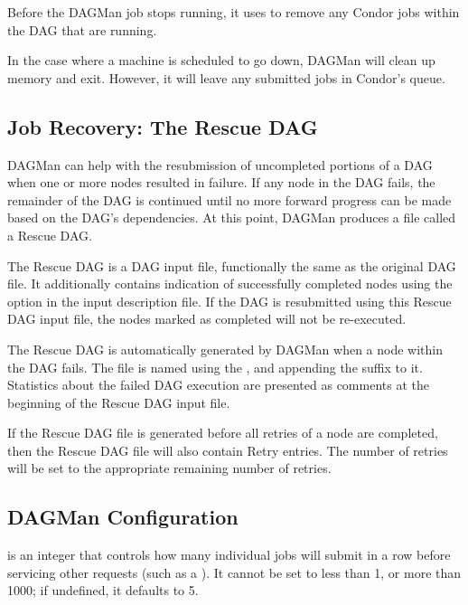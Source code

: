 Before the DAGMan job stops running, it uses 
to remove any Condor jobs within the DAG that are running.

In the case where a
machine is scheduled to go down,
DAGMan will clean up memory and exit.
However, it will leave any submitted jobs
in Condor's queue.

\subsection{Job Recovery:  The Rescue DAG}

DAGMan can help with the resubmission of uncompleted
portions of a DAG when one or more nodes resulted in failure.
If any node in the DAG fails,
the remainder of the DAG is continued until no more forward
progress can be made based on the DAG's dependencies.
At this point, DAGMan produces a file
called a Rescue DAG.

The Rescue DAG is a DAG input file,
functionally the same as the original DAG file.
It additionally contains indication of
successfully completed nodes using the 
option in the input description file.
If the DAG is resubmitted using this Rescue DAG input file,
the nodes marked as completed will not be re-executed.

The Rescue DAG is automatically generated by DAGMan when a node
within the DAG fails.
The file is named using the , and appending
the suffix  to it.
Statistics about the failed DAG execution are presented as
comments at the beginning of the Rescue DAG input file.

If the Rescue DAG file is generated before all retries
of a node are completed, 
then the Rescue DAG file will also contain Retry entries.
The number of retries will be set to the appropriate remaining
number of retries. 


\subsection{DAGMan Configuration}

 is an integer that
controls how many individual jobs  will submit in a row
before servicing other requests (such as a ).  It cannot be
set to less than 1, or more than 1000; if undefined, it defaults to 5.

